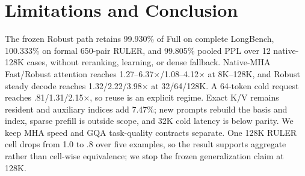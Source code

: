 \section{Limitations and Conclusion}
\label{sec:conclusion}

The frozen Robust path retains 99.930\% of Full on complete LongBench,
100.333\% on formal 650-pair RULER, and 99.805\% pooled PPL over 12
native-128K cases, without reranking, learning, or dense fallback.
Native-MHA Fast/Robust attention reaches
1.27--6.37$\times$/1.08--4.12$\times$ at 8K--128K, and Robust steady decode
reaches 1.32/2.22/3.98$\times$ at 32/64/128K.  A 64-token cold request reaches
.81/1.31/2.15$\times$, so reuse is an explicit regime.  Exact K/V remains
resident and auxiliary indices add 7.47\%; new prompts rebuild the basis and
index, sparse prefill is outside scope, and 32K cold latency is below parity.
We keep MHA speed and GQA task-quality contracts separate.  One 128K RULER
cell drops from 1.0 to .8 over five examples, so the result supports aggregate
rather than cell-wise equivalence; we stop the frozen generalization claim at
128K.
